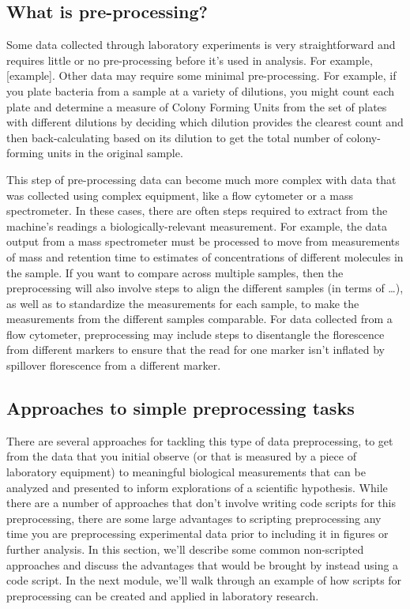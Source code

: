 \documentclass[]{tufte-book}
\begin{document}
\hypertarget{what-is-pre-processing}{%
\subsection{What is pre-processing?}\label{what-is-pre-processing}}

Some data collected through laboratory experiments is very straightforward and
requires little or no pre-processing before it's used in analysis. For example,
{[}example{]}. Other data may require some minimal pre-processing. For example, if
you plate bacteria from a sample at a variety of dilutions, you might count each
plate and determine a measure of Colony Forming Units from the set of plates
with different dilutions by deciding which dilution provides the clearest count
and then back-calculating based on its dilution to get the total number of
colony-forming units in the original sample.

This step of pre-processing data can become much more complex with data that was
collected using complex equipment, like a flow cytometer or a mass spectrometer.
In these cases, there are often steps required to extract from the machine's
readings a biologically-relevant measurement. For example, the data output from
a mass spectrometer must be processed to move from measurements of mass and
retention time to estimates of concentrations of different molecules in the
sample. If you want to compare across multiple samples, then the preprocessing
will also involve steps to align the different samples (in terms of \ldots), as
well as to standardize the measurements for each sample, to make the
measurements from the different samples comparable. For data collected from a
flow cytometer, preprocessing may include steps to disentangle the florescence
from different markers to ensure that the read for one marker isn't inflated by
spillover florescence from a different marker.

\hypertarget{approaches-to-simple-preprocessing-tasks}{%
\subsection{Approaches to simple preprocessing tasks}\label{approaches-to-simple-preprocessing-tasks}}

There are several approaches for tackling this type of data preprocessing, to
get from the data that you initial observe (or that is measured by a piece of
laboratory equipment) to meaningful biological measurements that can be analyzed
and presented to inform explorations of a scientific hypothesis. While there are
a number of approaches that don't involve writing code scripts for this
preprocessing, there are some large advantages to scripting preprocessing any
time you are preprocessing experimental data prior to including it in figures or
further analysis. In this section, we'll describe some common non-scripted
approaches and discuss the advantages that would be brought by instead using a
code script. In the next module, we'll walk through an example of how scripts
for preprocessing can be created and applied in laboratory research.
\end{document}

